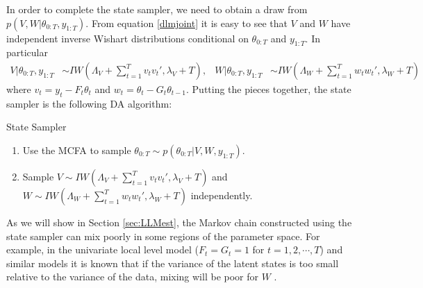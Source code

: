 \documentclass{article}
\begin{document}
In order to complete the state sampler, we need to obtain a draw from $p(V,W|\theta_{0:T},y_{1:T})$. From equation \ref{dlmjoint} it is easy to see that $V$ and $W$ have independent inverse Wishart distributions conditional on $\theta_{0:T}$ and $y_{1:T}$. In particular
\begin{align*}
  V|\theta_{0:T},y_{1:T} &\sim IW\left(\Lambda_V + \sum_{t=1}^Tv_tv_t',\lambda_V + T\right), &
  W|\theta_{0:T},y_{1:T} &\sim IW\left(\Lambda_W + \sum_{t=1}^Tw_tw_t',\lambda_{W} + T\right) %
\end{align*}
where $v_t = y_t - F_t\theta_t$ and $w_t = \theta_t - G_t\theta_{t-1}$. Putting the pieces together, the state sampler is the following DA algorithm:
\begin{alg*}[State]State Sampler
\label{alg:DLMstate}
\begin{enumerate}
\item Use the MCFA to sample $\theta_{0:T} \sim p(\theta_{0:T}|V,W,y_{1:T})$.
\item Sample $V \sim IW\left(\Lambda_V + \sum_{t=1}^Tv_tv_t',\lambda_V + T\right)$ and $W \sim IW\left(\Lambda_W + \sum_{t=1}^Tw_tw_t',\lambda_{W} + T\right)$ independently. 
\end{enumerate}
\end{alg*}
\noindent As we will show in Section \ref{sec:LLMest}, the Markov chain constructed using the state sampler can mix poorly in some regions of the parameter space. For example, in the univariate local level model ($F_t=G_t=1$ for $t=1,2,\cdots,T$) and similar models it is known that if the variance of the latent states is too small relative to the variance of the data, mixing will be poor for $W$ \cite{fruhwirth2004efficient}.
\end{document}

